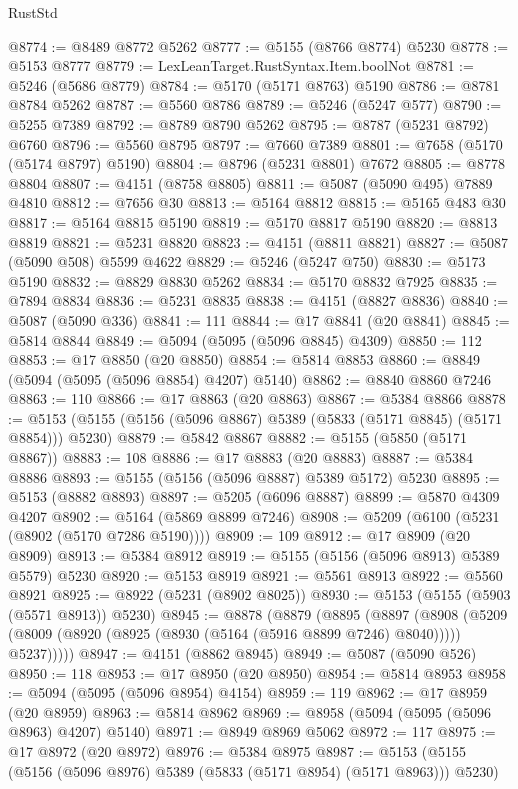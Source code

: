 \begin{lexlean}{RustStd}
\begin{coremodule}
@8774 := @8489 @8772 @5262
@8777 := @5155 (@8766 @8774) @5230
@8778 := @5153 @8777
@8779 := LexLeanTarget.RustSyntax.Item.boolNot
@8781 := @5246 (@5686 @8779)
@8784 := @5170 (@5171 @8763) @5190
@8786 := @8781 @8784 @5262
@8787 := @5560 @8786
@8789 := @5246 (@5247 @577)
@8790 := @5255 @7389
@8792 := @8789 @8790 @5262
@8795 := @8787 (@5231 @8792) @6760
@8796 := @5560 @8795
@8797 := @7660 @7389
@8801 := @7658 (@5170 (@5174 @8797) @5190)
@8804 := @8796 (@5231 @8801) @7672
@8805 := @8778 @8804
@8807 := @4151 (@8758 @8805)
@8811 := @5087 (@5090 @495) @7889 @4810
@8812 := @7656 @30
@8813 := @5164 @8812
@8815 := @5165 @483 @30
@8817 := @5164 @8815 @5190
@8819 := @5170 @8817 @5190
@8820 := @8813 @8819
@8821 := @5231 @8820
@8823 := @4151 (@8811 @8821)
@8827 := @5087 (@5090 @508) @5599 @4622
@8829 := @5246 (@5247 @750)
@8830 := @5173 @5190
@8832 := @8829 @8830 @5262
@8834 := @5170 @8832 @7925
@8835 := @7894 @8834
@8836 := @5231 @8835
@8838 := @4151 (@8827 @8836)
@8840 := @5087 (@5090 @336)
@8841 := 111
@8844 := @17 @8841 (@20 @8841)
@8845 := @5814 @8844
@8849 := @5094 (@5095 (@5096 @8845) @4309)
@8850 := 112
@8853 := @17 @8850 (@20 @8850)
@8854 := @5814 @8853
@8860 := @8849 (@5094 (@5095 (@5096 @8854) @4207) @5140)
@8862 := @8840 @8860 @7246
@8863 := 110
@8866 := @17 @8863 (@20 @8863)
@8867 := @5384 @8866
@8878 := @5153 (@5155 (@5156 (@5096 @8867) @5389 (@5833 (@5171 @8845) (@5171 @8854))) @5230)
@8879 := @5842 @8867
@8882 := @5155 (@5850 (@5171 @8867))
@8883 := 108
@8886 := @17 @8883 (@20 @8883)
@8887 := @5384 @8886
@8893 := @5155 (@5156 (@5096 @8887) @5389 @5172) @5230
@8895 := @5153 (@8882 @8893)
@8897 := @5205 (@6096 @8887)
@8899 := @5870 @4309 @4207
@8902 := @5164 (@5869 @8899 @7246)
@8908 := @5209 (@6100 (@5231 (@8902 (@5170 @7286 @5190))))
@8909 := 109
@8912 := @17 @8909 (@20 @8909)
@8913 := @5384 @8912
@8919 := @5155 (@5156 (@5096 @8913) @5389 @5579) @5230
@8920 := @5153 @8919
@8921 := @5561 @8913
@8922 := @5560 @8921
@8925 := @8922 (@5231 (@8902 @8025))
@8930 := @5153 (@5155 (@5903 (@5571 @8913)) @5230)
@8945 := @8878
    (@8879
      (@8895
        (@8897
          (@8908 (@5209 (@8009 (@8920 (@8925 (@8930 (@5164 (@5916 @8899 @7246) @8040))))) @5237)))))
@8947 := @4151 (@8862 @8945)
@8949 := @5087 (@5090 @526)
@8950 := 118
@8953 := @17 @8950 (@20 @8950)
@8954 := @5814 @8953
@8958 := @5094 (@5095 (@5096 @8954) @4154)
@8959 := 119
@8962 := @17 @8959 (@20 @8959)
@8963 := @5814 @8962
@8969 := @8958 (@5094 (@5095 (@5096 @8963) @4207) @5140)
@8971 := @8949 @8969 @5062
@8972 := 117
@8975 := @17 @8972 (@20 @8972)
@8976 := @5384 @8975
@8987 := @5153 (@5155 (@5156 (@5096 @8976) @5389 (@5833 (@5171 @8954) (@5171 @8963))) @5230)

\end{coremodule}
\end{lexlean}
